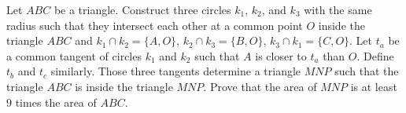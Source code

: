 Let $ABC$ be a triangle. Construct three circles $k_1$,  $k_2$,  and $k_3$ with the same radius such that they intersect each other at a common point $O$ inside the triangle $ABC$ and $k_1\cap k_2=\{A,O\}$,  $k_2 \cap k_3=\{B,O\}$,  $k_3\cap k_1=\{C,O\}$. Let $t_a$ be a common tangent of circles $k_1$ and $k_2$ such that $A$ is closer to $t_a$ than $O$. Define $t_b$ and $t_c$ similarly. Those three tangents determine a triangle $MNP$ such that the triangle $ABC$ is inside the triangle $MNP$. Prove that the area of $MNP$ is at least $9$ times the area of $ABC$.